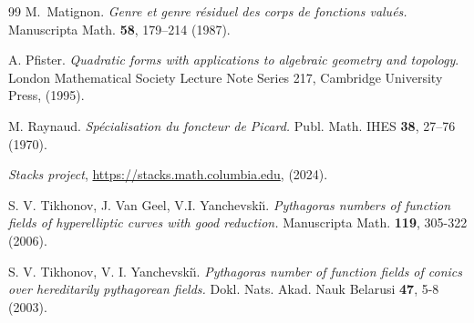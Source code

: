 \documentclass[a4paper,12pt,reqno]{amsart}
\theoremstyle{definition}
\numberwithin{equation}{thm}
\begin{document}
\begin{thebibliography}{99}
M.~Matignon. \textit{
Genre et genre r\'esiduel des corps de fonctions valu\'es.} Manuscripta Math. {\bf 58}, 179--214 (1987). 

 A. Pfister.
\textit{Quadratic forms with applications to algebraic geometry and topology}.
London Mathematical Society Lecture Note Series 217, Cambridge University Press, (1995).





M. Raynaud. \textit{Sp\'ecialisation du foncteur de Picard.} Publ. Math. IHES \textbf{38},
27–76 (1970).

 \textit{Stacks project}, \url{https://stacks.math.columbia.edu}, (2024).

S. V. Tikhonov, J. Van Geel, V.I. Yanchevski\u{\i}. \textit{Pythagoras numbers of function fields of hyperelliptic curves with good reduction.} Manuscripta Math. \textbf{119}, 305-322 (2006).


S. V. Tikhonov, V. I. Yanchevski\u{\i}. \textit{Pythagoras number of function fields of conics over hereditarily pythagorean fields.} Dokl. Nats. Akad. Nauk Belarusi \textbf{47}, 5-8 (2003).








%



\end{thebibliography}
\end{document}
